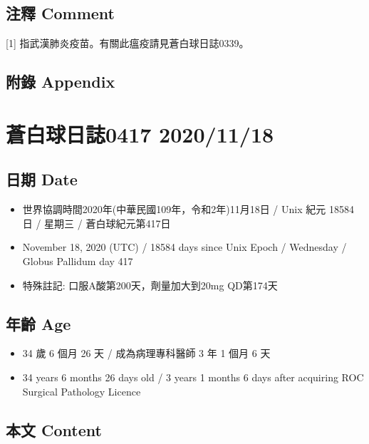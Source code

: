 \documentclass[
]{article}
\providecommand{\tightlist}{%
  \setlength{\itemsep}{0pt}\setlength{\parskip}{0pt}}
\begin{document}
\hypertarget{ux6ce8ux91cb-comment-12}{%
\subsection{注釋 Comment}\label{ux6ce8ux91cb-comment-12}}

{[}1{]} 指武漢肺炎疫苗。有關此瘟疫請見蒼白球日誌0339。

\hypertarget{ux9644ux9304-appendix-12}{%
\subsection{附錄 Appendix}\label{ux9644ux9304-appendix-12}}

\hypertarget{ux84bcux767dux7403ux65e5ux8a8c0417-20201118}{%
\section{蒼白球日誌0417
2020/11/18}\label{ux84bcux767dux7403ux65e5ux8a8c0417-20201118}}

\hypertarget{ux65e5ux671f-date-13}{%
\subsection{日期 Date}\label{ux65e5ux671f-date-13}}

\begin{itemize}
\tightlist
\item
  世界協調時間2020年(中華民國109年，令和2年)11月18日 / Unix 紀元 18584
  日 / 星期三 / 蒼白球紀元第417日
\item
  November 18, 2020 (UTC) / 18584 days since Unix Epoch / Wednesday /
  Globus Pallidum day 417
\item
  特殊註記: 口服A酸第200天，劑量加大到20mg QD第174天
\end{itemize}

\hypertarget{ux5e74ux9f61-age-13}{%
\subsection{年齡 Age}\label{ux5e74ux9f61-age-13}}

\begin{itemize}
\tightlist
\item
  34 歲 6 個月 26 天 / 成為病理專科醫師 3 年 1 個月 6 天
\item
  34 years 6 months 26 days old / 3 years 1 months 6 days after
  acquiring ROC Surgical Pathology Licence
\end{itemize}

\hypertarget{ux672cux6587-content-13}{%
\subsection{本文 Content}\label{ux672cux6587-content-13}}
\end{document}
